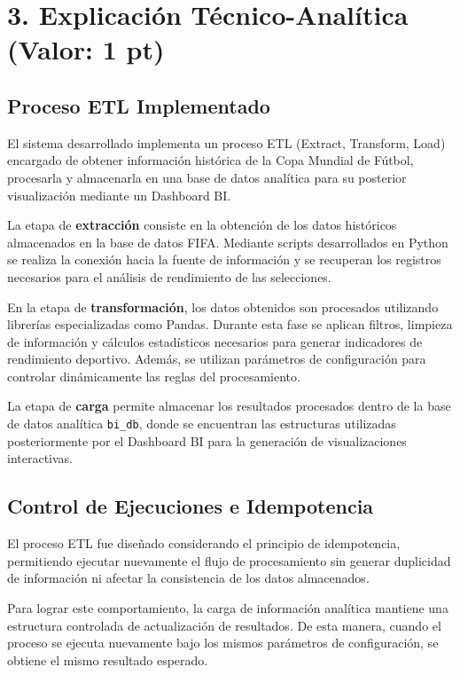 \documentclass[
  letterpaper,
  DIV=11,
  numbers=noendperiod]{scrartcl}
\begin{document}
\section{3. Explicación Técnico-Analítica (Valor: 1
pt)}\label{explicaciuxf3n-tuxe9cnico-analuxedtica-valor-1-pt}

\subsection{Proceso ETL Implementado}\label{proceso-etl-implementado}

El sistema desarrollado implementa un proceso ETL (Extract, Transform,
Load) encargado de obtener información histórica de la Copa Mundial de
Fútbol, procesarla y almacenarla en una base de datos analítica para su
posterior visualización mediante un Dashboard BI.

La etapa de \textbf{extracción} consiste en la obtención de los datos
históricos almacenados en la base de datos FIFA. Mediante scripts
desarrollados en Python se realiza la conexión hacia la fuente de
información y se recuperan los registros necesarios para el análisis de
rendimiento de las selecciones.

En la etapa de \textbf{transformación}, los datos obtenidos son
procesados utilizando librerías especializadas como Pandas. Durante esta
fase se aplican filtros, limpieza de información y cálculos estadísticos
necesarios para generar indicadores de rendimiento deportivo. Además, se
utilizan parámetros de configuración para controlar dinámicamente las
reglas del procesamiento.

La etapa de \textbf{carga} permite almacenar los resultados procesados
dentro de la base de datos analítica \texttt{bi\_db}, donde se
encuentran las estructuras utilizadas posteriormente por el Dashboard BI
para la generación de visualizaciones interactivas.

\subsection{Control de Ejecuciones e
Idempotencia}\label{control-de-ejecuciones-e-idempotencia}

El proceso ETL fue diseñado considerando el principio de idempotencia,
permitiendo ejecutar nuevamente el flujo de procesamiento sin generar
duplicidad de información ni afectar la consistencia de los datos
almacenados.

Para lograr este comportamiento, la carga de información analítica
mantiene una estructura controlada de actualización de resultados. De
esta manera, cuando el proceso se ejecuta nuevamente bajo los mismos
parámetros de configuración, se obtiene el mismo resultado esperado.
\end{document}
